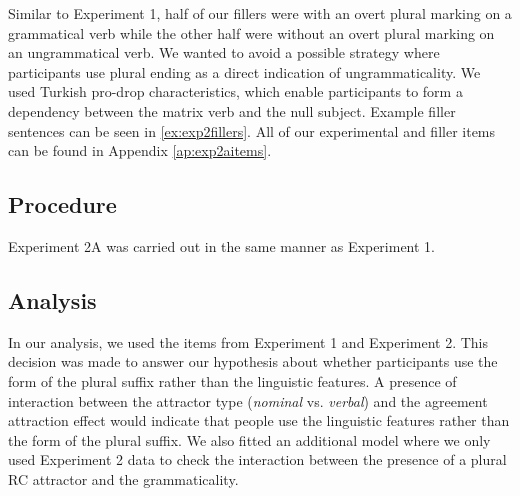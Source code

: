 Similar to Experiment 1, half of our fillers were with an overt plural marking on a grammatical verb while the other half were without an overt plural marking on an ungrammatical verb. We wanted to avoid a possible strategy where participants use plural ending as a direct indication of ungrammaticality. We used Turkish pro-drop characteristics, which enable participants to form a dependency between the matrix verb and the null subject. Example filler sentences can be seen in \ref{ex:exp2fillers}. All of our experimental and filler items can be found in Appendix \ref{ap:exp2aitems}. 

\ea \label{ex:exp2fillers}
    \z
\z



\subsection{Procedure}

Experiment 2A was carried out in the same manner as Experiment 1. 

\subsection{Analysis}

In our analysis, we used the items from Experiment 1 and Experiment 2. This decision was made to answer our hypothesis about whether participants use the form of the plural suffix rather than the linguistic features. A presence of interaction between the attractor type (\textit{nominal} vs. \textit{verbal}) and the agreement attraction effect would indicate that people use the linguistic features rather than the form of the plural suffix. We also fitted an additional model where we only used Experiment 2 data to check the interaction between the presence of a plural RC attractor and the grammaticality. 

